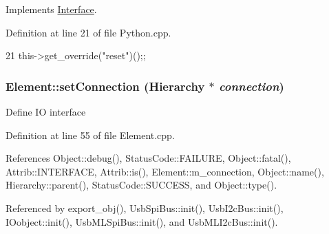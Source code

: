 Implements \hyperlink{classInterface_a4d44329cea9981a9e0392eaaf99efadd}{Interface}.

Definition at line 21 of file Python.cpp.


\begin{DoxyCode}
21 {this->get_override("reset")();};
\end{DoxyCode}
\hypertarget{classElement_ab476b4b1df5954141ceb14f072433b89}{
\subsubsection[{setConnection}]{ Element::setConnection ({\bf Hierarchy} $\ast$ {\em connection})}}
\label{classElement_ab476b4b1df5954141ceb14f072433b89}
Define IO interface 

Definition at line 55 of file Element.cpp.

References Object::debug(), StatusCode::FAILURE, Object::fatal(), Attrib::INTERFACE, Attrib::is(), Element::m\_\-connection, Object::name(), Hierarchy::parent(), StatusCode::SUCCESS, and Object::type().

Referenced by export\_\-obj(), UsbSpiBus::init(), UsbI2cBus::init(), IOobject::init(), UsbMLSpiBus::init(), and UsbMLI2cBus::init().


